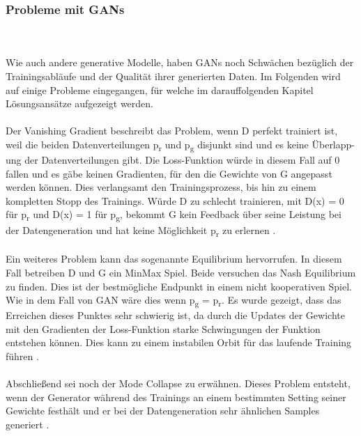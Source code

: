 \documentclass{llncs}
\begin{document}
\subsubsection{Probleme mit GANs}\label{sec:problemegan}
~\\\\
Wie auch andere generative Modelle, haben GANs noch Schwächen bezüglich der Trainingsabläufe und der Qualität ihrer generierten Daten. Im Folgenden wird auf einige Probleme eingegangen, für welche im darauffolgenden Kapitel Lösungsansätze aufgezeigt werden. 
~\\\\
Der Vanishing Gradient beschreibt das Problem, wenn D perfekt trainiert ist, weil die beiden Datenverteilungen p\textsubscript{r} und p\textsubscript{g} disjunkt sind und es keine Überlapp-ung der Datenverteilungen gibt. Die Loss-Funktion würde in diesem Fall auf 0 fallen und es gäbe keinen Gradienten, für den die Gewichte von G angepasst werden können. Dies verlangsamt den Trainingsprozess, bis hin zu einem kompletten Stopp des Trainings. Würde D zu schlecht trainieren, mit D(x) = 0 für p\textsubscript{r} und  D(x) = 1 für p\textsubscript{g}, bekommt G kein Feedback über seine Leistung bei der Datengeneration und hat keine Möglichkeit p\textsubscript{r} zu erlernen \cite{vanishing}.
~\\\\
Ein weiteres Problem kann das sogenannte Equilibrium hervorrufen. In diesem Fall betreiben D und G ein MinMax Spiel. Beide versuchen das Nash Equilibrium zu finden. Dies ist der bestmögliche Endpunkt in einem nicht kooperativen Spiel. Wie in dem Fall von GAN wäre dies wenn  p\textsubscript{g} = p\textsubscript{r}. Es wurde gezeigt, dass das Erreichen dieses Punktes sehr schwierig ist, da durch die Updates der Gewichte mit den Gradienten der Loss-Funktion starke Schwingungen der Funktion entstehen können. Dies kann zu einem instabilen Orbit für das laufende Training führen \cite{improvingan}.   
~\\\\
Abschließend sei noch der Mode Collapse zu erwähnen. Dieses Problem entsteht, wenn der Generator während des Trainings an einem bestimmten Setting seiner Gewichte festhält und er bei der Datengeneration sehr ähnlichen Samples generiert \cite{improvingan}.
\end{document}
